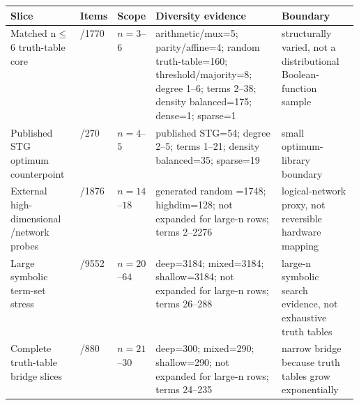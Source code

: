\begin{tabularx}{\linewidth}{>{\raggedright\arraybackslash}p{0.20\linewidth}>{\raggedleft\arraybackslash}p{0.08\linewidth}>{\raggedright\arraybackslash}p{0.08\linewidth}>{\raggedright\arraybackslash}X>{\raggedright\arraybackslash}p{0.22\linewidth}}
\toprule
Slice & Items & Scope & Diversity evidence & Boundary \\
\midrule
Matched n$\leq$6 truth-table core & 177/1770 & $n=3$--$6$ & arithmetic/mux=5; parity/affine=4; random truth-table=160; threshold/majority=8; degree 1--6; \anf{} terms 2--38; density balanced=175; dense=1; sparse=1 & structurally varied, not a distributional Boolean-function sample \\
Published STG optimum counterpoint & 54/270 & $n=4$--$5$ & published STG=54; degree 2--5; \anf{} terms 1--21; density balanced=35; sparse=19 & small optimum-library boundary \\
External high-dimensional \anf{}/network probes & 1876/1876 & $n=14$--$18$ & generated random \anf{}=1748; highdim=128; not expanded for large-n rows; terms 2--2276 & logical-network proxy, not reversible hardware mapping \\
Large symbolic term-set stress & 1128/9552 & $n=20$--$64$ & deep=3184; mixed=3184; shallow=3184; not expanded for large-n rows; terms 26--288 & large-n symbolic search evidence, not exhaustive truth tables \\
Complete truth-table bridge slices & 88/880 & $n=21$--$30$ & deep=300; mixed=290; shallow=290; not expanded for large-n rows; terms 24--235 & narrow bridge because truth tables grow exponentially \\
\bottomrule
\end{tabularx}
